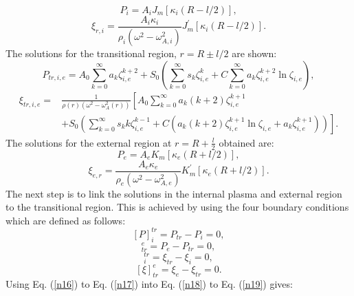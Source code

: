 \documentclass[12pt,a4paper,twoside]{article}
\begin{document}
\begin{equation}\label{n16}
P_i = A_i J_m[ \kappa_i(R- l/2)] , 
\end{equation}
\begin{equation}
\xi_{r,i} = \frac{A_i \kappa_i}{\rho_i(\omega^2-\omega_{A,i}^2)}J^{\prime}_m\left[ \kappa_i \left( R- l/2 \right) \right] .
\end{equation}
The solutions for the transitional region, $r = R \pm l/2$ are shown:
\begin{equation}\label{eq80}
P_{tr,i,e} = A_0\sum^{\infty}_{k=0} a_k \zeta_{i,e}^{k+2}+S_0 \left( \sum^{\infty}_{k=0} s_k \zeta_{i,e}^k+ C\sum^{\infty}_{k=0} a_k \zeta_{i,e}^{k+2} \ln \zeta_{i,e} \right) ,
\end{equation}
\begin{equation}\label{eq81}
\begin{split}
\xi_{tr,i,e} = & \frac{1}{\rho(r)(\omega^2-\omega^2_A(r))} \left[ A_0 \sum^{\infty}_{k=0} a_k(k+2) \zeta_{i,e}^{k+1} \right. \\ & \left.   +S_0 \left( \sum^{\infty}_{k=0} s_k k \zeta_{i,e}^{k-1} +C \left( a_k (k+2) \zeta_{i,e}^{k+1} \ln \zeta_{i,e}+ a_k \zeta_{i,e}^{k+1} \right)  \right) \right] .
\end{split}
\end{equation}
The solutions for the external region at $r = R+ \frac{l}{2}$ obtained are:
\begin{equation}
P_e = A_e K_m [\kappa_e(R+l/2)] ,
\end{equation}
\begin{equation}\label{n17}
\xi_{e,r} = \frac{A_e \kappa_e}{\rho_e (\omega^2-\omega^2_{A,e})} K^{\prime}_m[\kappa_e(R+l/2)] .
\end{equation}
The next step is to link the solutions in the internal plasma and external region to the transitional region. This is achieved by using the four boundary conditions which are defined as follows: 
\begin{equation}\label{n18}
[P]^{tr}_i = P_{tr}-P_i=0 ,
\end{equation}
\begin{equation}
[P]^e_{tr} = P_e - P_{tr} = 0 ,
\end{equation}
\begin{equation}
[\xi]^{tr}_i = \xi_{tr}-\xi_i = 0 ,
\end{equation}
\begin{equation}\label{n19}
[\xi]^{e}_{tr} = \xi_e - \xi_{tr} = 0 . 
\end{equation}
Using Eq. (\ref{n16}) to Eq. (\ref{n17}) into Eq. (\ref{n18}) to Eq. (\ref{n19}) gives:
\end{document}
